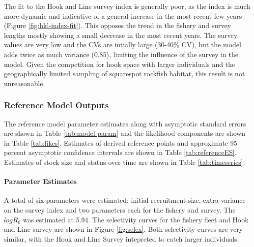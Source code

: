 \documentclass[11pt,
  english,
  a4paper,
]{article}
\begin{document}
The fit to the Hook and Line survey index is generally poor, as the index is much more dynamic and indicative of a general increase in the most recent few years (Figure \ref{fig:hkl-index-fit}). This opposes the trend in the fishery and survey lengths mostly showing a small decrease in the most recent years. The survey values are very low and the CVs are intially large (30-40\% CV), but the model adds twice as much variance (0.85), limiting the influence of the survey in the model. Given the competition for hook space with larger individuals and the geographically limited sampling of squarespot rockfish habitat, this result is not unreasonable.

\leavevmode\tagmcend\tagstructend\par


\hypertarget{reference-model-outputs}{%
\subsubsection{Reference Model Outputs}\label{reference-model-outputs}}

\leavevmode\tagmcend\tagstructend


The reference model parameter estimates along with asymptotic standard errors are shown in Table \ref{tab:model-param} and the likelihood components are shown in Table \ref{tab:likes}. Estimates of derived reference points and approximate 95 percent asymptotic confidence intervals are shown in Table \ref{tab:referenceES}. Estimates of stock size and status over time are shown in Table \ref{tab:timeseries}.

\leavevmode\tagmcend\tagstructend\par


\hypertarget{parameter-estimates}{%
\paragraph{Parameter Estimates}\label{parameter-estimates}}

\leavevmode\tagmcend\tagstructend


A total of six parameters were estimated: initial recruitment size, extra variance on the survey index and two parameters each for the fishery and survey. The {\(logR_0\)\leavevmode\tagmcend\tagstructend} was estimated at 5.94. The selectivity curves for the fishery fleet and Hook and Line survey are shown in Figure \ref{fig:selex}. Both selectivity curves are very similar, with the Hook and Line Survey intepreted to catch larger individuals.
\end{document}

